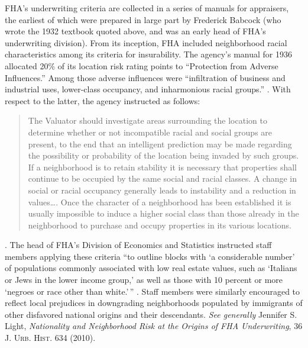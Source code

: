 


FHA's underwriting criteria are collected in a series of manuals for appraisers,
the earliest of which were prepared in large part by Frederick Babcock (who
wrote the 1932 textbook quoted above, and was an early head of FHA's
underwriting division). From its inception, FHA included neighborhood racial
characteristics among its criteria for insurability. The agency's manual for
1936 allocated 20\% of its location risk rating points to ``Protection from
Adverse Influences.'' Among those adverse influences were ``infiltration of
business and industrial uses, lower-class occupancy, and inharmonious racial
groups.''
.
With respect to the latter, the agency instructed as follows:
\begin{quote}
The Valuator should investigate areas surrounding the location to determine
whether or not incompatible racial and social groups are present, to the end
that an intelligent prediction may be made regarding the possibility or
probability of the location being invaded by such groups. If a neighborhood is
to retain stability it is necessary that properties shall continue to be
occupied by the same social and racial classes. A change in social or racial
occupancy generally leads to instability and a reduction in values{\dots}. Once
the character of a neighborhood has been established it is usually impossible
to induce a higher social class than those already in the neighborhood to
purchase and occupy properties in its various locations.
\end{quote}
.
The head of FHA's Division of Economics and Statistics instructed staff
members applying these criteria ``to outline blocks with `a considerable
number' of populations commonly associated with low real estate values, such as
`Italians or Jews in the lower income group,' as well as those with 10 percent
or more `negroes or race other than white.'\,''
. Staff members were similarly encouraged to reflect
local prejudices in downgrading neighborhoods populated by immigrants of other
disfavored national origins and their descendants. \textit{See generally}
Jennifer S. Light, \textit{Nationality and Neighborhood Risk at the Origins of
FHA Underwriting}, 36 \textsc{J. Urb. Hist.} 634 (2010). 

